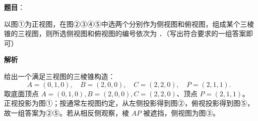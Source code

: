 \begin{answer}

\textbf{题目}：

以图①为正视图，在图②③④⑤中选两个分别作为侧视图和俯视图，组成某个三棱锥的三视图，则所选侧视图和俯视图的编号依次为 \gkblank{}．（写出符合要求的一组答案即可）
\nopagebreak[4]
\begin{center}\end{center}
\nopagebreak[4]
\textbf{解析}

给出一个满足三视图的三棱锥构造：
\nopagebreak[4]
\[
A=(0,1,0),\quad B=(2,0,0),\quad C=(2,2,0),\quad P=(2,1,1).
\]
取底面顶点 $A=(0,1,0),B=(2,0,0),C=(2,2,0)$、顶点 $P=(2,1,1)$。正视投影为图①；按通常左视图约定，从左侧投影得到图②，俯视投影得到图⑤，故一组答案为②⑤。若从相反侧观察，棱 $AP$ 被遮挡，侧视图为图③。


\end{answer}

